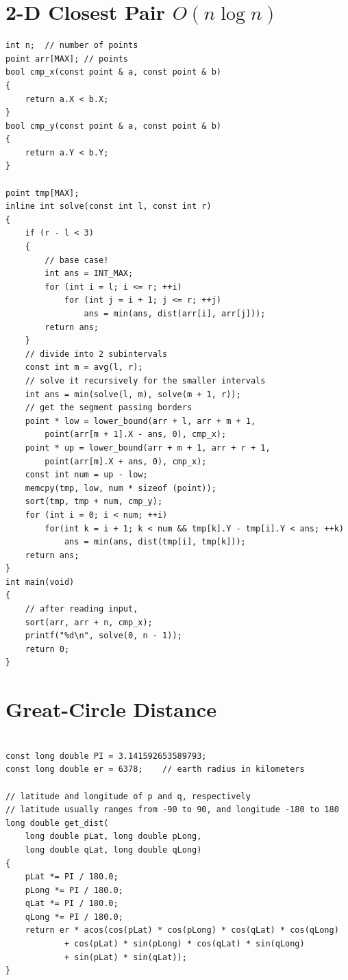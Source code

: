 \documentclass[12pt]{book}
\begin{document}
\section{2-D Closest Pair $O(n\log n)$}
\begin{verbatim}
int n;	// number of points
point arr[MAX];	// points
bool cmp_x(const point & a, const point & b)
{
	return a.X < b.X;
}
bool cmp_y(const point & a, const point & b)
{
	return a.Y < b.Y;
}

point tmp[MAX];
inline int solve(const int l, const int r)
{
	if (r - l < 3)
	{
		// base case!
		int ans = INT_MAX;
		for (int i = l; i <= r; ++i)
			for (int j = i + 1; j <= r; ++j)
				ans = min(ans, dist(arr[i], arr[j]));
		return ans;
	}
	// divide into 2 subintervals
	const int m = avg(l, r);
	// solve it recursively for the smaller intervals
	int ans = min(solve(l, m), solve(m + 1, r));
	// get the segment passing borders
	point * low = lower_bound(arr + l, arr + m + 1,
		point(arr[m + 1].X - ans, 0), cmp_x);
	point * up = lower_bound(arr + m + 1, arr + r + 1,
		point(arr[m].X + ans, 0), cmp_x);
	const int num = up - low;
	memcpy(tmp, low, num * sizeof (point));
	sort(tmp, tmp + num, cmp_y);
	for (int i = 0; i < num; ++i)
		for(int k = i + 1; k < num && tmp[k].Y - tmp[i].Y < ans; ++k)
			ans = min(ans, dist(tmp[i], tmp[k]));
	return ans;
}
int main(void)
{
	// after reading input,
	sort(arr, arr + n, cmp_x);
	printf("%d\n", solve(0, n - 1));
	return 0;
}

\end{verbatim}
\section{Great-Circle Distance}
\begin{verbatim}

const long double PI = 3.141592653589793;
const long double er = 6378;	// earth radius in kilometers

// latitude and longitude of p and q, respectively
// latitude usually ranges from -90 to 90, and longitude -180 to 180
long double get_dist(
	long double pLat, long double pLong,
	long double qLat, long double qLong)
{
	pLat *= PI / 180.0;
	pLong *= PI / 180.0;
	qLat *= PI / 180.0;
	qLong *= PI / 180.0;
	return er * acos(cos(pLat) * cos(pLong) * cos(qLat) * cos(qLong)
			+ cos(pLat) * sin(pLong) * cos(qLat) * sin(qLong)
			+ sin(pLat) * sin(qLat));
}
\end{verbatim}
\end{document}
